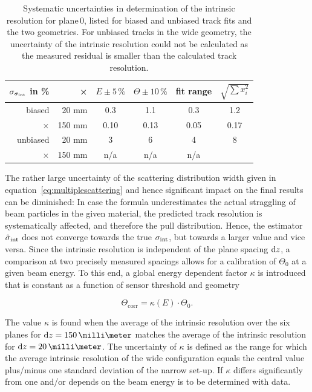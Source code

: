 \begin{table}[tbp]
 \begin{center}
  \begin{tabular}{r|r|c|c|c||c}
  $\sigma_{\sigma_{\textrm{int}}}$ in \% & × & $E\pm5\,\%$ & $\Theta\pm10\,\%$ & fit range & $\sqrt{\sum x_i^2}$\\ \hline
  biased   &  20 mm & 0.3 & 1.1  & 0.3 & 1.2 \\
  ×        & 150 mm & 0.10 & 0.13 & 0.05 & 0.17\\
  unbiased &  20 mm &   3 & 6    & 4  & 8\\
  ×        & 150 mm & n/a & n/a  & n/a & \\
  \end{tabular}
    \caption[Systematic uncertainties for plane\,0]{Systematic uncertainties in determination of the intrinsic resolution for plane\,0, listed for biased and unbiased track fits and the two geometries.
  For unbiased tracks in the wide geometry, the uncertainty of the intrinsic resolution could not be calculated as the measured residual is smaller than the calculated track resolution.}
  \label{tab:uncerts}
 \end{center}
\end{table}

The rather large uncertainty of the scattering distribution width given in equation~\ref{eq:multiplescattering} and hence significant impact on the final results can be diminished: 
In case the formula underestimates the actual straggling of beam particles in the given material, the predicted track resolution is systematically affected, and therefore the pull distribution. 
Hence, the estimator $\hat{\sigma}_{\textrm{int}}$ does not converge towards the true $\sigma_{\textrm{int}}$, but towards a larger value and vice versa. 
Since the intrinsic resolution is independent of the plane spacing $\textrm{d}z$, a comparison at two precisely measured spacings allows for a calibration of $\Theta_0$ at a given beam energy. 
To this end, a global energy dependent factor $\kappa$ is introduced that is constant as a function of sensor threshold and geometry

\begin{equation}
 \Theta_{\textrm{corr}} = \kappa(E) \cdot \Theta_0.
 \label{eq:thetacorr}
\end{equation}

\noindent
The value $\kappa$ is found when the average of the intrinsic resolution over the six planes for $\dz = 150\,\milli\meter$ matches the average of the intrinsic resolution for $\dz = 20\,\milli\meter$. 
The uncertainty of $\kappa$ is defined as the range for which the average intrinsic resolution of the wide configuration equals the central value plus/minus one standard deviation of the narrow set-up. 
If $\kappa$ differs significantly from one and/or depends on the beam energy is to be determined with data. 


